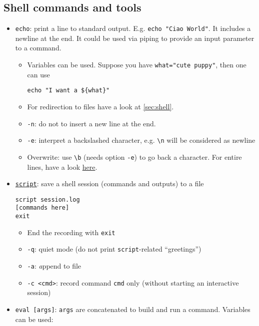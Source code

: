 \documentclass[a4paper,12pt,%
              final%
              ]{article}
\begin{document}
\subsection{Shell commands and tools}
\label{ssec:shell_tools}
\begin{itemize}
  \item \texttt{echo}: print a line to standard output. E.g. \verb|echo "Ciao World"|. It includes a newline at the end. It could be used via piping to provide an input parameter to a command.
    \begin{itemize}
      \item Variables can be used. Suppose you have \verb|what="cute puppy"|, then one can use
\begin{verbatim}
echo "I want a ${what}"
\end{verbatim}
      \item For redirection to files have a look at \autoref{sec:shell}.
      \item \verb|-n|: do not to insert a new line at the end.
      \item \verb|-e|: interpret a backslashed character, e.g. \verb|\n| will be considered as newline
      \item Overwrite: use \verb|\b| (needs option \verb|-e|) to go back a character. For entire lines, have a look \href{https://stackoverflow.com/questions/11283625/overwrite-last-line-on-terminal}{here}.
    \end{itemize}
  \item \href{https://man7.org/linux/man-pages/man1/script.1.html}{\texttt{script}}: save a shell session (commands and outputs) to a file
\begin{verbatim}
script session.log
[commands here]
exit
\end{verbatim}
    \begin{itemize}
      \item End the recording with \texttt{exit}
      \item \verb|-q|: quiet mode (do not print \texttt{script}-related ``greetings'')
      \item \verb|-a|: \emph{a}ppend to file
      \item \verb|-c <cmd>|: record command \verb|cmd| only (without starting an interactive session)
    \end{itemize}
  \item \verb|eval [args]|: \verb|args| are concatenated to build and run a command. Variables can be used:
\begin{verbatim}

\end{verbatim}
\end{itemize}
\end{document}
